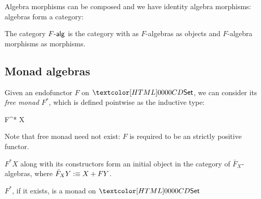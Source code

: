 Algebra morphisms can be composed and we have identity algebra
morphisms: algebras form a category:

\begin{definition}
  The category $\algcat{F}$ is the category with as $F$-algebras as
  objects and $F$-algebra morphisms as morphisms.
\end{definition}

\subsection{Monad algebras}

Given an endofunctor $F$ on $\Set$, we can consider its \emph{free
  monad} $F^*$, which is defined pointwise as the inductive type:

\begin{datatype}{F^* X}{\Set}
   \\
\end{datatype}

Note that free monad need not exist: $F$ is required to be an strictly
positive functor.

$F^* X$ along with its constructors form an initial object in the
category of $\bar{F}_X$-algebras, where $\bar{F}_X Y :\equiv X + FY$.

\begin{proposition}
  \label{free-monad-thm}
  $F^*$, if it exists, is a monad on $\Set$
\end{proposition}

